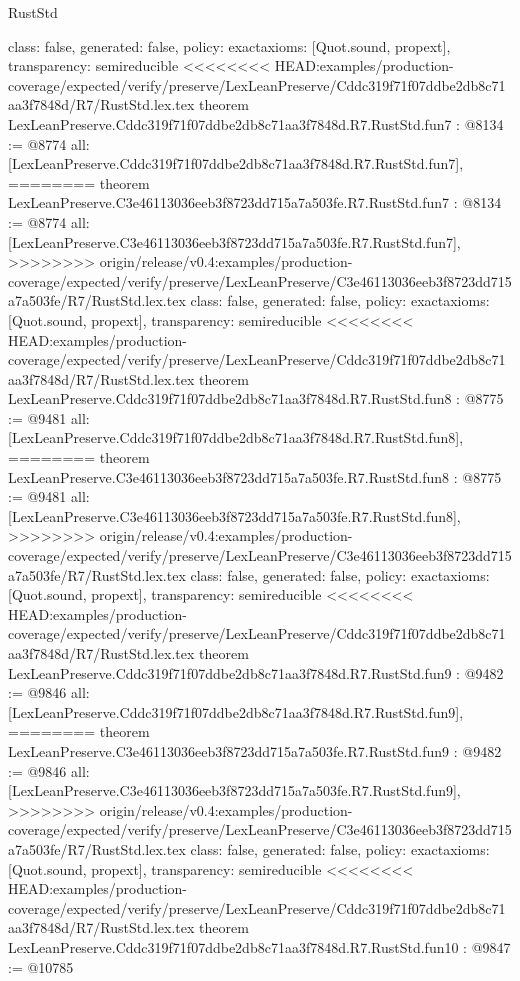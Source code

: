 \begin{lexlean}{RustStd}
\begin{coremodule}
{\begin{coremodule}
{{{{{{{{{{  class: false,
  generated: false,
  policy: exact{axioms: [Quot.sound, propext]},
  transparency: semireducible
}
<<<<<<<< HEAD:examples/production-coverage/expected/verify/preserve/LexLeanPreserve/Cddc319f71f07ddbe2db8c71aa3f7848d/R7/RustStd.lex.tex
theorem LexLeanPreserve.Cddc319f71f07ddbe2db8c71aa3f7848d.R7.RustStd.fun7 : @8134 := @8774 {
  all: [LexLeanPreserve.Cddc319f71f07ddbe2db8c71aa3f7848d.R7.RustStd.fun7],
========
theorem LexLeanPreserve.C3e46113036eeb3f8723dd715a7a503fe.R7.RustStd.fun7 : @8134 := @8774 {
  all: [LexLeanPreserve.C3e46113036eeb3f8723dd715a7a503fe.R7.RustStd.fun7],
>>>>>>>> origin/release/v0.4:examples/production-coverage/expected/verify/preserve/LexLeanPreserve/C3e46113036eeb3f8723dd715a7a503fe/R7/RustStd.lex.tex
  class: false,
  generated: false,
  policy: exact{axioms: [Quot.sound, propext]},
  transparency: semireducible
}
<<<<<<<< HEAD:examples/production-coverage/expected/verify/preserve/LexLeanPreserve/Cddc319f71f07ddbe2db8c71aa3f7848d/R7/RustStd.lex.tex
theorem LexLeanPreserve.Cddc319f71f07ddbe2db8c71aa3f7848d.R7.RustStd.fun8 : @8775 := @9481 {
  all: [LexLeanPreserve.Cddc319f71f07ddbe2db8c71aa3f7848d.R7.RustStd.fun8],
========
theorem LexLeanPreserve.C3e46113036eeb3f8723dd715a7a503fe.R7.RustStd.fun8 : @8775 := @9481 {
  all: [LexLeanPreserve.C3e46113036eeb3f8723dd715a7a503fe.R7.RustStd.fun8],
>>>>>>>> origin/release/v0.4:examples/production-coverage/expected/verify/preserve/LexLeanPreserve/C3e46113036eeb3f8723dd715a7a503fe/R7/RustStd.lex.tex
  class: false,
  generated: false,
  policy: exact{axioms: [Quot.sound, propext]},
  transparency: semireducible
}
<<<<<<<< HEAD:examples/production-coverage/expected/verify/preserve/LexLeanPreserve/Cddc319f71f07ddbe2db8c71aa3f7848d/R7/RustStd.lex.tex
theorem LexLeanPreserve.Cddc319f71f07ddbe2db8c71aa3f7848d.R7.RustStd.fun9 : @9482 := @9846 {
  all: [LexLeanPreserve.Cddc319f71f07ddbe2db8c71aa3f7848d.R7.RustStd.fun9],
========
theorem LexLeanPreserve.C3e46113036eeb3f8723dd715a7a503fe.R7.RustStd.fun9 : @9482 := @9846 {
  all: [LexLeanPreserve.C3e46113036eeb3f8723dd715a7a503fe.R7.RustStd.fun9],
>>>>>>>> origin/release/v0.4:examples/production-coverage/expected/verify/preserve/LexLeanPreserve/C3e46113036eeb3f8723dd715a7a503fe/R7/RustStd.lex.tex
  class: false,
  generated: false,
  policy: exact{axioms: [Quot.sound, propext]},
  transparency: semireducible
}
<<<<<<<< HEAD:examples/production-coverage/expected/verify/preserve/LexLeanPreserve/Cddc319f71f07ddbe2db8c71aa3f7848d/R7/RustStd.lex.tex
theorem LexLeanPreserve.Cddc319f71f07ddbe2db8c71aa3f7848d.R7.RustStd.fun10 : @9847 := @10785 {
}}}}}}}}}}}}}
\end{coremodule}}
\end{coremodule}
\end{lexlean}
